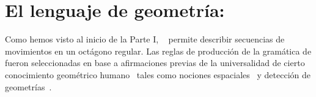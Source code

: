 \section{El lenguaje de geometría: \gramgeo}


Como hemos visto al inicio de la Parte I, \gramgeo~\cite{amalric2017language} permite describir secuencias de movimientos en un octágono regular. Las reglas de producción de la gramática de \gramgeo fueron seleccionadas en base a afirmaciones previas de la universalidad de cierto conocimiento geométrico humano~\cite{izard2011geometry,dehaene2006core,dillon2013core} tales como nociones espaciales~\cite{landau1981spatial,lee2012navigation} y detección de geometrías~\cite{westphal2012production,machilsen2009role}.

